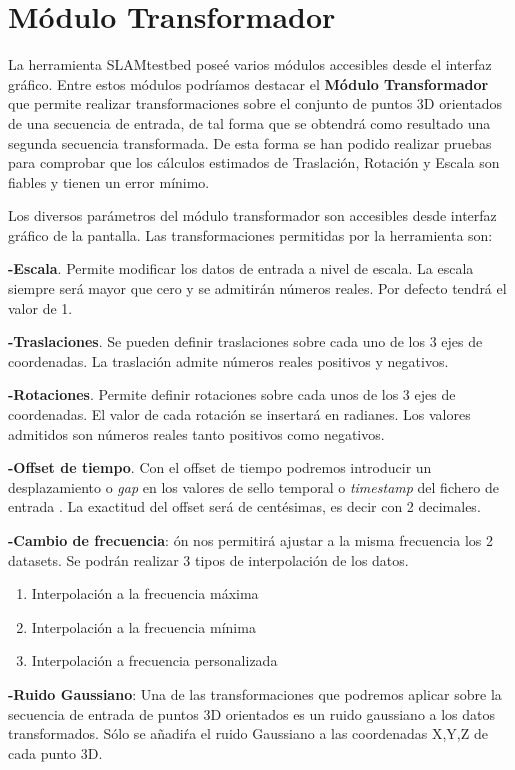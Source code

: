  
\section{Módulo Transformador}
La herramienta SLAMtestbed poseé varios módulos accesibles desde el interfaz gráfico. Entre estos módulos podríamos destacar el \textbf{Módulo Transformador} que permite
realizar transformaciones sobre el conjunto de puntos 3D orientados de una secuencia de entrada, de tal forma que se obtendrá como resultado una segunda secuencia transformada. De esta forma se han podido realizar pruebas para comprobar que los cálculos estimados de Traslación, Rotación y Escala son fiables y tienen un error mínimo.

Los diversos parámetros del módulo transformador son accesibles desde interfaz gráfico de la pantalla. Las transformaciones permitidas por la herramienta son:

\textbf{-Escala}. Permite modificar los datos de entrada a nivel de escala. La escala siempre será mayor que cero y se admitirán números reales. Por defecto tendrá el valor de 1. 

\textbf{-Traslaciones}. Se pueden definir traslaciones sobre cada uno de los 3 ejes de coordenadas. La traslación admite números reales positivos y negativos.

\textbf{-Rotaciones}. Permite definir rotaciones sobre cada unos de los 3 ejes de coordenadas. El valor de cada rotación se insertará en radianes. Los valores admitidos son números reales tanto positivos como negativos. 

\textbf{-Offset de tiempo}. Con el offset de tiempo podremos introducir un desplazamiento o \textit{gap} en los valores de sello temporal o \textit{timestamp} del fichero de entrada . La exactitud del offset será de centésimas, es decir con 2 decimales.

\textbf{-Cambio de frecuencia}: ón nos permitirá ajustar a la misma frecuencia los 2 datasets. Se podrán realizar 3 tipos de interpolación de los datos.
\begin{enumerate}
	\item{Interpolación a la frecuencia máxima}
	\item{Interpolación a la frecuencia mínima}
	\item{Interpolación a frecuencia personalizada}
\end{enumerate}

\textbf{-Ruido Gaussiano}: Una de las transformaciones que podremos aplicar sobre la secuencia de entrada de puntos 3D orientados es un ruido gaussiano a los datos transformados. Sólo se añadiŕa el ruido Gaussiano a las coordenadas X,Y,Z de cada punto 3D.

